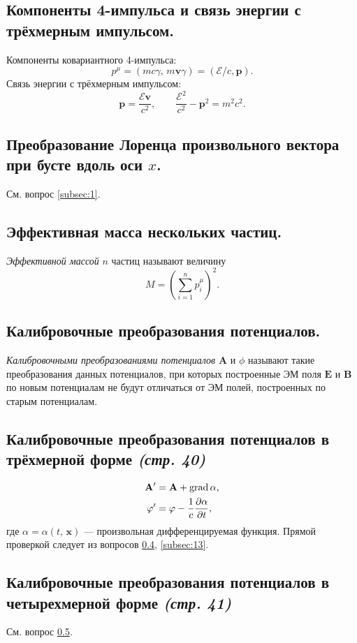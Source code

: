 \documentclass[a4paper,12pt]{article}
\begin{document}
\subsection{Компоненты 4-импульса и связь энергии с трёхмерным импульсом.}
Компоненты ковариантного 4-импульса:
\[
	p^\mu=\left( mc\gamma,\,m\mathbf{v}\gamma \right) =\left( \mathcal{E} /c,
	\mathbf{p}\right) 
.\]
Связь энергии с трёхмерным импульсом:
\[
	\mathbf{p}=\frac{\mathcal{E}\mathbf{v}}{c^2}, \qquad
	\frac{\mathcal{E}^2}{c^2}-\mathbf{p}^2=m^2c^2
.\] 
\subsection{Преобразование Лоренца произвольного вектора при бусте вдоль оси
$x$.}
См. вопрос \ref{subsec:1}.
\subsection{Эффективная масса нескольких частиц.}
\begin{dfn}
	\emph{Эффективной массой} $n$ частиц называют величину
	\[
		M=\left( \sum_{i=1}^{n} p^\mu_i \right)^2 
	.\] 
\end{dfn}
\subsection{Калибровочные преобразования потенциалов.}
\label{subsec:10}
\begin{dfn}
	\emph{Калибровочными преобразованиями потенциалов}  $\mathbf{A}$ и
	$\phi$ называют такие преобразования данных потенциалов, при которых
	построенные ЭМ поля $\mathbf{E}$ и $\mathbf{B}$ по новым потенциалам
	не будут отличаться от ЭМ полей, построенных по старым потенциалам.
\end{dfn}
\subsection{Калибровочные преобразования потенциалов в трёхмерной форме \emph{(стр. 40)}}
\label{subsec:11}
\begin{align*}
	\mathbf{A}'&=\mathbf{A}+\operatorname{grad} \alpha,\\
	\varphi'&=\varphi-\frac{1}{c}\frac{\partial \alpha}{\partial t} 
,\end{align*}
где $\alpha=\alpha(t,\,\mathbf{x})$ --- произвольная дифференцируемая функция.
Прямой проверкой следует из вопросов \ref{subsec:10}, \ref{subsec:13}.
\subsection{Калибровочные преобразования потенциалов в четырехмерной форме
\emph{(стр. 41)}}
	См. вопрос \ref{subsec:11}.
	
\end{document}
